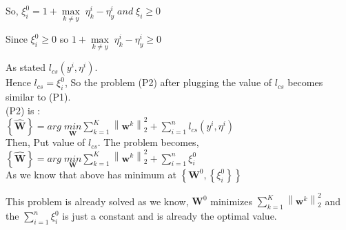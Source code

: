 \documentclass[a4paper,11pt]{article}
\begin{document}
\begin{mlsolution}
So, 
\begin{math}\xi_{i}^{0} =   1 + \underset{k\neq y}{\max} \;\eta_{k}^{i} - \eta_{y} ^{i}  \;and\; \xi_{i}\geq 0\end{math}

Since \begin{math}\xi_{i}^{0} \geq 0\end{math}  \;so \; \begin{math} 1 + \underset{k\neq y}{\max} \;\eta_{k}^{i} - \eta_{y} ^{i} \geq 0 \end{math}

As stated \begin{math} l_{cs}\left ( y^{i},\eta ^{i} \right ) \end{math}.\\ 

Hence \begin{math} l_{cs} = \xi_{i}^{0}\end{math}, So the problem (P2) after plugging the value of \begin{math} l_{cs} \end{math} becomes similar to (P1).\\

(P2) is :\\

\begin{math}\left \{ \widehat{\textbf{W}} \right \} = \underset{\textbf{}}{arg} \; \underset{  \textbf{W}}{min} \sum_{k=1}^{K} \left \| \textbf{w}^{k} \right \|^{2}_{2} + \sum_{i=1}^{n} l _{cs}\left ( y^{i}, \eta ^{i} \right )\end{math}\\

Then, Put value of \begin{math} l_{cs}\end{math}. The problem becomes,\\

\begin{math}\left \{ \widehat{\textbf{W}} \right \} = \underset{\textbf{}}{arg} \; \underset{  \textbf{W}}{min} \sum_{k=1}^{K} \left \| \textbf{w}^{k} \right \|^{2}_{2} + \sum_{i=1}^{n} \xi_{i}^{0}\end{math}\\

As we know that above has minimum at \begin{math}\left \{ \textbf{W}^{0}, \left \{ \xi _{i}^{0} \right \} \right \} \end{math}

This problem is already solved as we know, \begin{math}\textbf{W}^{0}\end{math} minimizes  \begin{math}\sum_{k=1}^{K} \left \| \textbf{w}^{k} \right \|^{2}_{2}\end{math} and the \begin{math}\sum_{i=1}^{n} \xi_{i}^{0}\end{math} is just a constant and is already the optimal value.\\


\end{mlsolution}
\end{document}
